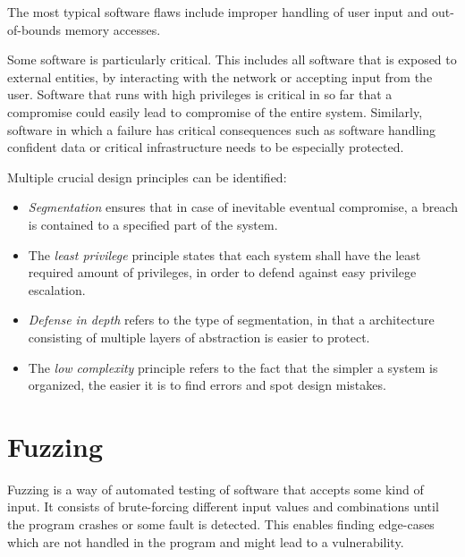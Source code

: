 The most typical software flaws include improper handling of user input and
out-of-bounds memory accesses.

Some software is particularly critical. This includes all software that is
exposed to external entities, by interacting with the network or accepting input
from the user. Software that runs with high privileges is critical in so far
that a compromise could easily lead to compromise of the entire system.
Similarly, software in which a failure has critical consequences such as
software handling confident data or critical infrastructure needs to be
especially protected.

Multiple crucial design principles can be identified:
\begin{itemize}
    \item \emph{Segmentation} ensures that in case of inevitable eventual
          compromise, a breach is contained to a specified part of the system.
    \item The \emph{least privilege} principle states that each system shall
          have the least required amount of privileges, in order to defend
          against easy privilege escalation.
    \item \emph{Defense in depth} refers to the type of segmentation, in that a
          architecture consisting of multiple layers of abstraction is easier to
          protect.
    \item The \emph{low complexity} principle refers to the fact that the
          simpler a system is organized, the easier it is to find errors and
          spot design mistakes.
\end{itemize}

\section{Fuzzing}
\label{sec:fuzzing}
Fuzzing is a way of automated testing of software that accepts some kind of
input. It consists of brute-forcing different input values and combinations
until the program crashes or some fault is detected. This enables finding
edge-cases which are not handled in the program and might lead to a
vulnerability.